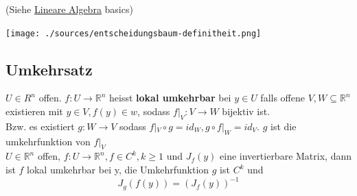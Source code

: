     (Siehe \href{#1.1}{Lineare Algebra} basics)\\
    \begin{minipage}{\linewidth}
      \texttt{[image: ./sources/entscheidungsbaum-definitheit.png]}
    \end{minipage}
\subsection{Umkehrsatz}
    $U\in R^n$ offen. $f:U\rightarrow\mathbb R^n$ heisst \textbf{lokal
    umkehrbar} bei $y\in U$ falls offene $V,W\subseteq\mathbb R^n$ existieren
    mit $y\in V, f(y)\in w$, sodass $f|_V:V\rightarrow W$ bijektiv ist.\\
    Bzw. es existiert $g:W\rightarrow V$ sodass $f|_V\circ g=id_W, g\circ
    f|_W=id_V$. $g$ ist die umkehrfunktion von $f|_V$\\
  $U\in\mathbb R^n$ offen, $f:U\rightarrow\mathbb R^n, f\in C^k, k\geq1$ und
  $J_f(y)$ eine invertierbare Matrix, dann ist $f$ lokal umkehrbar bei y, die
  Umkehrfunktion $g$ ist $C^k$ und $$J_g(f(y))=(J_f(y))^{-1}$$

